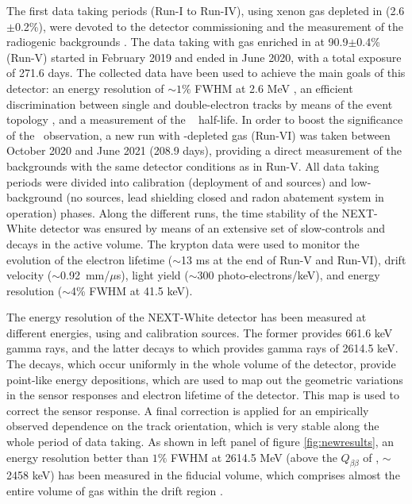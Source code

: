 The first data taking periods (Run-I to Run-IV), using xenon gas depleted in  (2.6$\pm$0.2\%), were devoted to the detector commissioning and the measurement of the radiogenic backgrounds \cite{NEXT:2018zho,Novella:2019cne}. The data taking with gas enriched in  at 90.9$\pm$0.4\% (Run-V) started in February 2019 and ended in June 2020, with a total exposure of 271.6 days. The collected data have been used to achieve the main goals of this detector: an energy resolution of $\sim1\%$ FWHM at 2.6 MeV \cite{Renner:2019pfe}, an efficient discrimination between single and double-electron tracks by means of the event topology \cite{Ferrario:2019kwg,NEXT:2020jmz,NEXT:2021pjq}, and a measurement of the  \bbtnu~ half-life. In order to boost the significance of the \bbtnu ~observation, a new run with -depleted gas (Run-VI) was taken between October 2020 and June 2021 (208.9 days), providing a direct measurement of the backgrounds with the same detector conditions as in Run-V. All data taking periods were divided into calibration (deployment of  and  sources) and low-background (no sources, lead shielding closed and radon abatement system in operation) phases. Along the different runs, the time stability of the NEXT-White detector was ensured by means of an extensive set of slow-controls and  decays in the active volume. The krypton data were used to monitor the evolution of the electron lifetime ($\sim$13 ms at the end of Run-V and Run-VI), drift velocity ($\sim$0.92~mm/$\mu$s), light yield ($\sim$300 photo-electrons/keV), and energy resolution ($\sim$4\% FWHM at 41.5 keV).      


The energy resolution of the NEXT-White detector has been measured at different energies, using  and  calibration sources. The former provides 661.6 keV gamma rays, and the latter decays to  which provides gamma rays of 2614.5 keV. The  decays, which occur uniformly in the whole volume of the detector, provide point-like energy depositions, which are used to map out the geometric variations in the sensor responses and electron lifetime of the detector. This map is used to correct the sensor response. A final correction is applied for an empirically observed dependence on the track orientation, which is very stable along the whole period of data taking. As shown in left panel of figure \ref{fig:newresults}, an energy resolution better than $1\%$ FWHM at 2614.5 MeV (above the $Q_{\beta\beta}$ of , $\sim$2458 keV) has been measured in the fiducial volume, which comprises almost the entire volume of gas within the drift region \cite{Renner:2019pfe}.

